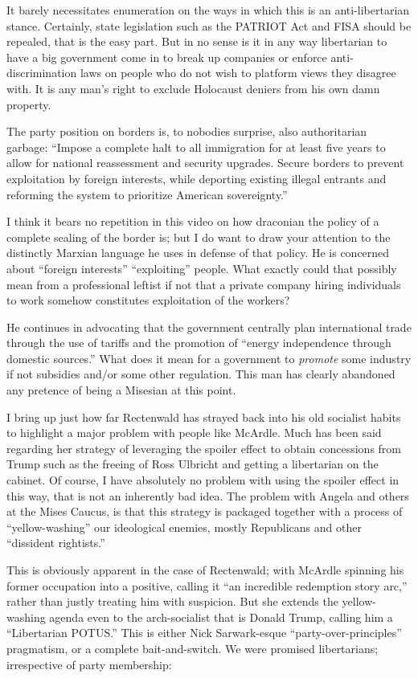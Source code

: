 \documentclass[11pt]{article}
\begin{document}
It barely necessitates enumeration on the ways in which this is an anti-libertarian stance. Certainly, state legislation such as the PATRIOT Act and FISA should be repealed, that is the easy part. But in no sense is it in any way libertarian to have a big government come in to break up companies or enforce anti-discrimination laws on people who do not wish to platform views they disagree with. It is any man's right to exclude Holocaust deniers from his own damn property.

The party position on borders is, to nobodies surprise, also authoritarian garbage: ``Impose a complete halt to all immigration for at least five years to allow for national reassessment and security upgrades. Secure borders to prevent exploitation by foreign interests, while deporting existing illegal entrants and reforming the system to prioritize American sovereignty.''

I think it bears no repetition in this video on how draconian the policy of a complete sealing of the border is; but I do want to draw your attention to the distinctly Marxian language he uses in defense of that policy. He is concerned about ``foreign interests'' ``exploiting'' people. What exactly could that possibly mean from a professional leftist if not that a private company hiring individuals to work somehow constitutes exploitation of the workers?

He continues in advocating that the government centrally plan international trade through the use of tariffs and the promotion of ``energy independence through domestic sources.'' What does it mean for a government to \emph{promote} some industry if not subsidies and/or some other regulation. This man has clearly abandoned any pretence of being a Misesian at this point.

I bring up just how far Rectenwald has strayed back into his old socialist habits to highlight a major problem with people like McArdle. Much has been said regarding her strategy of leveraging the spoiler effect to obtain concessions from Trump such as the freeing of Ross Ulbricht and getting a libertarian on the cabinet. Of course, I have absolutely no problem with using the spoiler effect in this way, that is not an inherently bad idea. The problem with Angela and others at the Mises Caucus, is that this strategy is packaged together with a process of ``yellow-washing'' our ideological enemies, mostly Republicans and other ``dissident rightists.''

This is obviously apparent in the case of Rectenwald; with McArdle spinning his former occupation into a positive, calling it ``an incredible redemption story arc,'' rather than justly treating him with suspicion. But she extends the yellow-washing agenda even to the arch-socialist that is Donald Trump, calling him a ``Libertarian POTUS.'' This is either Nick Sarwark-esque ``party-over-principles'' pragmatism, or a complete bait-and-switch. We were promised libertarians; irrespective of party membership:
\end{document}
